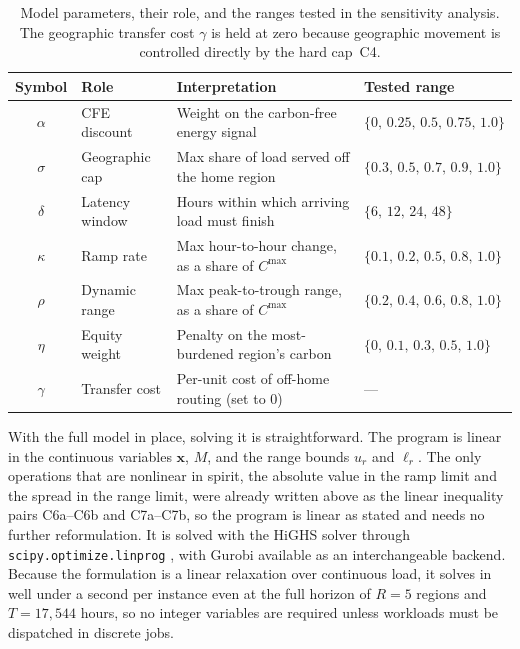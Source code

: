 \begin{table}[tbp]
\centering\small
\setlength{\tabcolsep}{8pt}
\renewcommand{\arraystretch}{1.2}
\begin{tabularx}{\linewidth}{clXl}
\toprule
\textbf{Symbol} & \textbf{Role} & \textbf{Interpretation} & \textbf{Tested range} \\
\midrule
$\alpha$ & CFE discount      & Weight on the carbon-free energy signal & $\{0,\,0.25,\,0.5,\,0.75,\,1.0\}$ \\
$\sigma$ & Geographic cap    & Max share of load served off the home region & $\{0.3,\,0.5,\,0.7,\,0.9,\,1.0\}$ \\
$\delta$ & Latency window    & Hours within which arriving load must finish & $\{6,\,12,\,24,\,48\}$ \\
$\kappa$ & Ramp rate         & Max hour-to-hour change, as a share of $C^{\max}$ & $\{0.1,\,0.2,\,0.5,\,0.8,\,1.0\}$ \\
$\rho$   & Dynamic range     & Max peak-to-trough range, as a share of $C^{\max}$ & $\{0.2,\,0.4,\,0.6,\,0.8,\,1.0\}$ \\
$\eta$   & Equity weight     & Penalty on the most-burdened region's carbon & $\{0,\,0.1,\,0.3,\,0.5,\,1.0\}$ \\
$\gamma$ & Transfer cost     & Per-unit cost of off-home routing (set to $0$) & --- \\
\bottomrule
\end{tabularx}
\caption{Model parameters, their role, and the ranges tested in the sensitivity analysis. The geographic transfer cost $\gamma$ is held at zero because geographic movement is controlled directly by the hard cap~C4.}
\label{tab:params}
\end{table}

\label{sec:form-implementation}
With the full model in place, solving it is straightforward. The program is linear in the continuous variables $\mathbf{x}$, $M$, and the range bounds $u_r$ and $\ell_r$. The only operations that are nonlinear in spirit, the absolute value in the ramp limit and the spread in the range limit, were already written above as the linear inequality pairs C6a--C6b and C7a--C7b, so the program is linear as stated and needs no further reformulation. It is solved with the HiGHS solver \citep{huangfu2018parallelizing} through \texttt{scipy.optimize.linprog} \citep{virtanen2020scipy}, with Gurobi available as an interchangeable backend. Because the formulation is a linear relaxation over continuous load, it solves in well under a second per instance even at the full horizon of $R = 5$ regions and $T = 17{,}544$ hours, so no integer variables are required unless workloads must be dispatched in discrete jobs.

